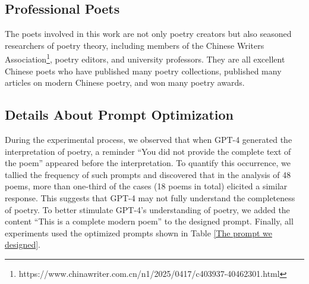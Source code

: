 \documentclass[11pt]{article}
\begin{document}
\subsection{Professional Poets}
\label{subsec: Professional Poets}
 
The poets involved in this work are not only poetry creators but also seasoned researchers of poetry theory, including members of the Chinese Writers Association\footnote{https://www.chinawriter.com.cn/n1/2025/0417/c403937-40462301.html}, poetry editors, and university professors. They are all excellent Chinese poets who have published many poetry collections, published many articles on modern Chinese poetry, and won many poetry awards. 








\subsection{Details About Prompt Optimization} 
\label{subsec: Details about Prompt Optimization}
During the experimental process, we observed that when GPT-4 generated the interpretation of poetry, a reminder ``You did not provide the complete text of the poem'' appeared before the interpretation. To quantify this occurrence, we tallied the frequency of such prompts and discovered that in the analysis of 48 poems, more than one-third of the cases (18 poems in total) elicited a similar response. This suggests that GPT-4 may not fully understand the completeness of poetry. To better stimulate GPT-4’s understanding of poetry, we added the content ``This is a complete modern poem'' to the designed prompt. Finally, all experiments used the optimized prompts 
shown in Table \ref{The prompt we designed}.
\end{document}
